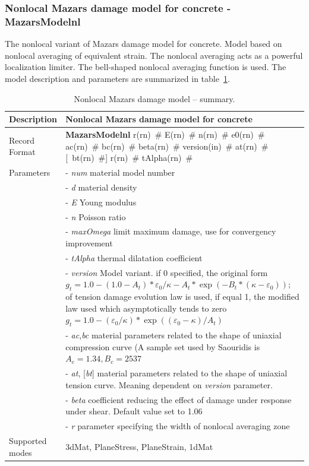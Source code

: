 \documentclass[a4paper]{article}
\newcommand{\descitem}[1]{{\noindent \bf #1}}
\newcommand{\elemparam}[2]{{{#1\tiny (#2)}~\#}}
\newcommand{\optelemparam}[2]{[{~\elemparam{#1}{#2}}]}
\newcommand{\param}[1]{{\it #1}}
\newcommand{\optparam}[1]{[{\it #1}]}
\begin{document}
\subsubsection{Nonlocal Mazars damage model for concrete - MazarsModelnl}
The nonlocal variant of Mazars damage model for concrete.
Model based on nonlocal averaging of equivalent strain.
The nonlocal averaging acts as a powerful localization
limiter. The bell-shaped nonlocal averaging function is used.
The model description and parameters are summarized
in table~\ref{maznl_table}.

\begin{table}[!htb]
\begin{tabular}{|l|p{9cm}|}
\hline
Description & Nonlocal Mazars damage model for concrete\\
\hline
Record Format & \descitem{MazarsModelnl} \elemparam{r}{rn} \elemparam{E}{rn}
\elemparam{n}{rn}  \elemparam{e0}{rn}
\elemparam{ac}{rn} \elemparam{bc}{rn} \elemparam{beta}{rn}
\elemparam{version}{in} \elemparam{at}{rn} \optelemparam{bt}{rn} \elemparam{r}{rn}
\elemparam{tAlpha}{rn} \\
Parameters &- \param{num} material model number\\
&- \param{d} material density\\
&- \param{E} Young modulus\\
&- \param{n} Poisson ratio\\
&- \param{maxOmega} limit maximum damage, use for convergency improvement\\
&- \param{tAlpha} thermal dilatation coefficient\\
&- \param{version} Model variant. if 0 specified, the original form
$g_t= 1.0-(1.0-A_t)*\varepsilon_0/\kappa - A_t*\exp(-B_t*(\kappa-\varepsilon_0));
$ of
tension damage evolution law is used, if equal 1, the modified law
used which asymptotically tends to zero
$g_t = 1.0-(\varepsilon_0/\kappa)*\exp((\varepsilon_0-\kappa)/A_t)$\\
&- \param{ac},\param{bc} material parameters related to the shape of
uniaxial compression curve (A sample set used by Saouridis is $A_c =
1.34, B_c = 2537$\\
&- \param{at}, \optparam{bt} material parameters related to the shape of
uniaxial tension curve. Meaning dependent on \param{version}
parameter.\\
&- \param{beta} coefficient reducing the effect of damage under
response under shear. Default value set to 1.06\\
&- \param{r} parameter specifying the width of nonlocal averaging zone\\
Supported modes& 3dMat, PlaneStress, PlaneStrain, 1dMat\\
\hline
\end{tabular}
\caption{Nonlocal Mazars damage model  -- summary.}
\label{maznl_table}
\end{table}
\end{document}
